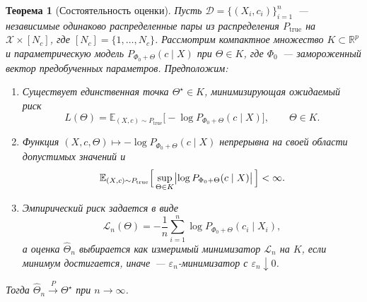 \documentclass{dissert}
\newtheorem{theorem}{Теорема}
\begin{document}
\begin{theorem}[Состоятельность оценки]
Пусть $\mathcal{D} = \{(X_i, c_i)\}_{i=1}^n$~--- независимые одинаково распределенные пары из распределения $P_{\mathrm{true}}$ на $\mathcal{X}\times [N_c]$, где $[N_c]=\{1,\ldots,N_c\}$.
Рассмотрим компактное множество $K\subset\mathbb{R}^p$ и параметрическую модель $P_{\Phi_0+\Theta}(c\mid X)$ при $\Theta\in K$, где $\Phi_0$~--- замороженный вектор предобученных параметров.
Предположим:
\begin{enumerate}
    \item Существует единственная точка $\Theta^\star \in K$, минимизирующая ожидаемый риск
    \[
        L(\Theta) = \mathbb{E}_{(X,c)\sim P_{\mathrm{true}}}\bigl[-\log P_{\Phi_0+\Theta}(c\mid X)\bigr],\qquad \Theta\in K.
    \]
    \item Функция $(X,c,\Theta)\mapsto -\log P_{\Phi_0+\Theta}(c\mid X)$ непрерывна на своей области допустимых значений и
    \[
        \mathbb{E}_{(X,c)\sim P_{\mathrm{true}}}\Bigl[\,\sup_{\Theta\in K}\bigl|\log P_{\Phi_0+\Theta}(c\mid X)\bigr|\,\Bigr] < \infty.
    \]
    \item Эмпирический риск задается в виде
    \begin{equation}
        \mathscr{L}_n(\Theta) = -\frac{1}{n} \sum_{i=1}^n \log P_{\Phi_0+\Theta}(c_i\mid X_i),
    \end{equation}
    а оценка $\widehat{\Theta}_n$ выбирается как измеримый минимизатор $\mathscr{L}_n$ на $K$, если минимум достигается, иначе~--- $\varepsilon_n$-минимизатор с $\varepsilon_n\downarrow 0$.
\end{enumerate}
Тогда $\widehat{\Theta}_n \xrightarrow{P} \Theta^\star$ при $n\to\infty$.
\end{theorem}
\end{document}

